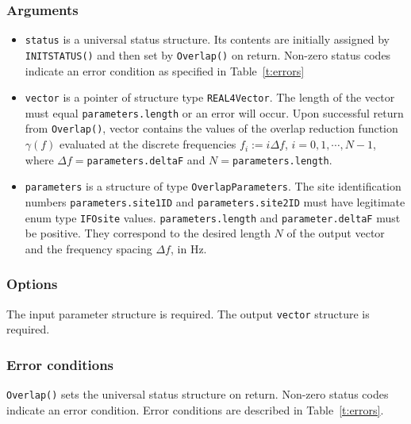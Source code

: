 \documentclass{article}
\begin{document}
\subsubsection{Arguments}

\begin{itemize}
\item 
{\tt status\/} is a universal status structure. 
Its contents are initially assigned by {\tt INITSTATUS()\/} and then 
set by {\tt Overlap()\/} on return. 
Non-zero status codes indicate an error condition as specified in 
Table~\ref{t:errors}
\item 
{\tt vector\/} is a pointer of structure type {\tt REAL4Vector}.
The length of the vector must equal {\tt parameters.length\/} or an 
error will occur.
Upon successful return from {\tt Overlap()\/}, vector contains the 
values of the overlap reduction function $\gamma(f)$ evaluated at the
discrete frequencies $f_i:=i\Delta f$, $i=0,1,\cdots, N-1$, where
$\Delta f=${\tt parameters.deltaF\/} and $N=${\tt parameters.length\/}.
\item 
{\tt parameters\/} is a structure of type {\tt OverlapParameters\/}.
The site identification numbers 
{\tt parameters.site1ID\/} and {\tt parameters.site2ID\/} must have 
legitimate enum type {\tt IFOsite} values.
{\tt parameters.length} and {\tt parameter.deltaF} must be positive.
They correspond to the desired length $N$ of the output vector and
the frequency spacing $\Delta f$, in Hz.
\end{itemize}

\subsubsection{Options}

The input parameter structure is required.
The output {\tt vector\/} structure is required. 

\subsubsection{Error conditions}

{\tt Overlap()\/} sets the universal status structure on return. 
Non-zero status codes indicate an error condition. 
Error conditions are described in Table~\ref{t:errors}.
\end{document}
